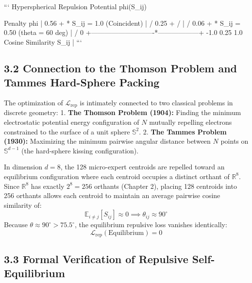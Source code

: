\documentclass[11pt,twoside,openright]{amsbook}
\begin{document}
{{{{{{{{```
                           Hyperspherical Repulsion Potential phi(S_ij)
                                         
                  Penalty phi
                       |
                  0.56 +                                   * S_ij = 1.0 (Coincident)
                       |                                  /
                  0.25 +                                 /
                       |                                /
                  0.06 +                               * S_ij = 0.50 (theta = 60 deg)
                       |                             /
                     0 +----------------------------*------------------+
                      -1.0                         0.25               1.0
                                              Cosine Similarity S_ij
                         | 
```

\subsection{3.2 Connection to the Thomson Problem and Tammes Hard-Sphere Packing}

The optimization of $\mathcal{L}_{\text{rep}}$ is intimately connected to two classical problems in discrete geometry:
1. \textbf{The Thomson Problem (1904):} Finding the minimum electrostatic potential energy configuration of $N$ mutually repelling electrons constrained to the surface of a unit sphere $\mathbb{S}^2$.
2. \textbf{The Tammes Problem (1930):} Maximizing the minimum pairwise angular distance between $N$ points on $\mathbb{S}^{d-1}$ (the hard-sphere kissing configuration).

In dimension $d = 8$, the 128 micro-expert centroids are repelled toward an equilibrium configuration where each centroid occupies a distinct orthant of $\mathbb{R}^8$. Since $\mathbb{R}^8$ has exactly $2^8 = 256$ orthants (Chapter 2), placing 128 centroids into 256 orthants allows each centroid to maintain an average pairwise cosine similarity of:
$$\mathbb{E}_{i \ne j}[S_{ij}] \approx 0 \implies \theta_{ij} \approx 90^\circ$$
Because $\theta \approx 90^\circ > 75.5^\circ$, the equilibrium repulsive loss vanishes identically:
$$\mathcal{L}_{\text{rep}}(\text{Equilibrium}) = 0$$

\subsection{3.3 Formal Verification of Repulsive Self-Equilibrium}

}}}}}}}}
\end{document}
